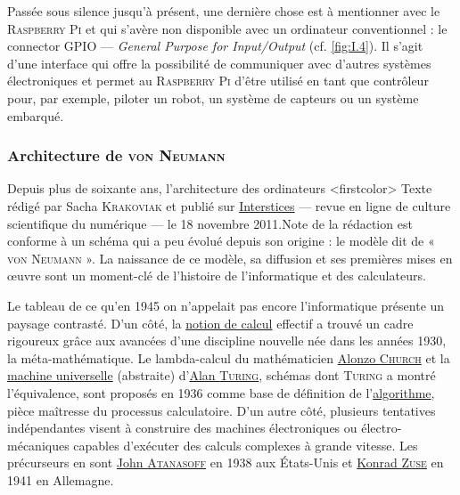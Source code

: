 Passée sous silence jusqu'à présent, une dernière chose est à mentionner avec le \textsc{Raspberry Pi} et qui s'avère non disponible avec un ordinateur conventionnel : le \gls{connector} \gls{GPIO} --- \textit{General Purpose for Input/Output} (cf. \cref{fig:I.4}). Il s'agit d'une interface qui offre la possibilité de communiquer avec d'autres systèmes électroniques et permet au \textsc{Raspberry Pi} d'être utilisé en tant que contrôleur pour, par exemple, piloter un robot, un système de capteurs ou un système embarqué.



\subsubsection[Architecture de \textsc{von Neumann}]{Architecture de \textsc{von Neumann}}
\label{subsub:I.1.2.2}

Depuis plus de soixante ans, l’architecture des ordinateurs
\caution[t]<firstcolor>{%
Texte rédigé par Sacha \textsc{Krakoviak} et publié sur \href{https://interstices.info/le-modele-darchitecture-de-von-neumann/}{Interstices} --- revue en ligne de culture scientifique du numérique --- le 18 novembre 2011.}{Note de la rédaction}
est con\-forme à un schéma qui a peu évolué depuis son origine : le modèle dit de « \textsc{von Neumann} ». La naissance de ce modèle, sa diffusion et ses premières mises en œuvre sont un moment-clé de l’histoire de l’informatique et des calculateurs.

Le tableau de ce qu’en 1945 on n’appelait pas encore l’informatique présente un paysage contrasté. D’un côté, la \href{https://interstices.info/le-calcul-une-notion-difficile-a-attraper/}{notion de calcul} effectif a trouvé un cadre rigoureux grâce aux avancées d’une discipline nouvelle née dans les années 1930, la méta-mathématique. Le lambda-calcul du mathématicien \href{http://serge.mehl.free.fr/chrono/church.html}{Alonzo \textsc{Church}} et la \href{https://interstices.info/comment-fonctionne-une-machine-de-turing/}{machine universelle} (abstraite) d’\href{https://interstices.info/turing-a-lassaut-denigma/}{Alan \textsc{Turing}}, schémas dont \textsc{Turing} a montré l’équivalence, sont proposés en 1936 comme base de définition de l’\href{https://interstices.info/quest-ce-quun-algorithme/}{algorithme}, pièce maîtresse du processus calculatoire. D’un autre côté, plusieurs tentatives indépendantes visent à construire des machines électroniques ou électro-mécaniques capables d’exécuter des calculs complexes à grande vitesse. Les précurseurs en sont \href{https://fr.wikipedia.org/wiki/Djon_Atanasov}{John \textsc{Atanasoff}} en 1938 aux États-Unis et \href{https://fr.wikipedia.org/wiki/Konrad_Zuse}{Konrad \textsc{Zuse}} en 1941 en Allemagne.

